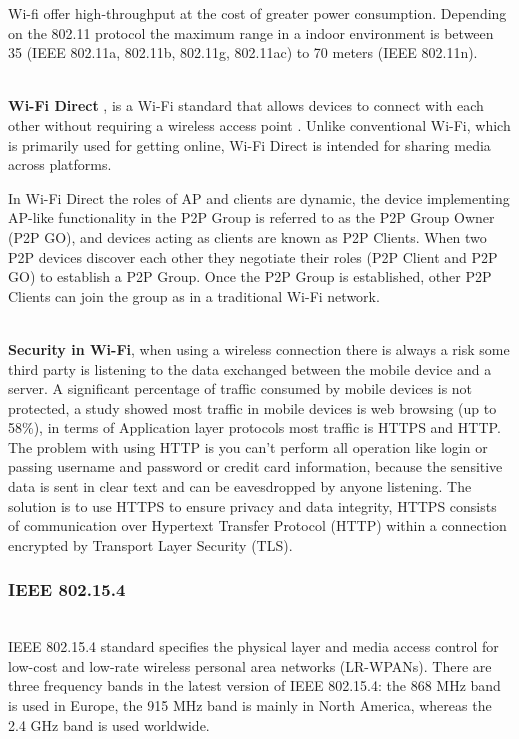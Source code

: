 Wi-fi offer high-throughput at the cost of greater power consumption. Depending on the 802.11 protocol the maximum range in a indoor environment is between 35 (IEEE 802.11a, 802.11b, 802.11g, 802.11ac) to 70 meters (IEEE 802.11n).

\mbox{}\\
\textbf{Wi-Fi Direct} \cite{wifi_direct,wifi_direct2},  is a Wi-Fi standard that allows devices to connect with each other without requiring a wireless access point .
Unlike conventional Wi-Fi, which is primarily used for getting online, Wi-Fi Direct is intended for sharing media across platforms.

In Wi-Fi Direct the roles of AP and clients are dynamic, the device implementing AP-like functionality in the P2P Group is referred to as the P2P Group Owner (P2P GO), and devices acting as clients are known as P2P Clients. When two P2P devices discover each other they negotiate their roles (P2P Client and P2P GO) to establish a P2P Group. Once the P2P Group is established, other P2P Clients can join the group as in a traditional Wi-Fi network.

\mbox{}\\
\textbf{Security in Wi-Fi}, when using a wireless connection there is always a risk some third party is listening to the data exchanged between the mobile device and a server. A significant percentage of traffic consumed by mobile devices is not protected, a study\cite{internet_traffic} showed most traffic in mobile devices is web browsing (up to 58\%), in terms of Application layer protocols most traffic is HTTPS and HTTP.
The problem with using HTTP is you can't perform all operation like login or passing username and password or credit card information, because the sensitive data is sent in clear text and can be eavesdropped by anyone listening. The solution is to use HTTPS to ensure privacy and data integrity, HTTPS consists of communication over Hypertext Transfer Protocol (HTTP) within a connection encrypted by Transport Layer Security (TLS).



\subsubsection{IEEE 802.15.4}\mbox{}\\

IEEE 802.15.4 standard\cite{livro_zigbee} specifies the physical layer and media access control for  low-cost and low-rate wireless personal area networks (LR-WPANs).
There are three frequency bands in the latest version of IEEE 802.15.4: the 868 MHz band is used in Europe, the 915 MHz band is mainly in North America, whereas the 2.4 GHz band is used worldwide.

